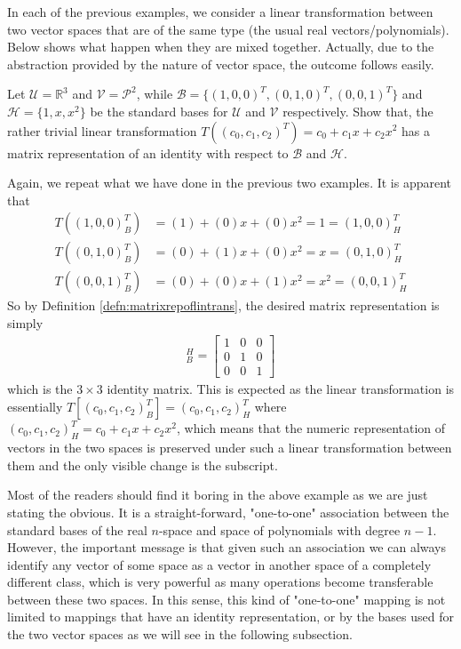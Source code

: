 In each of the previous examples, we consider a linear transformation between two vector spaces that are of the same type (the usual real vectors/polynomials). Below shows what happen when they are mixed together. Actually, due to the abstraction provided by the nature of vector space, the outcome follows easily.
\begin{exmp}
Let $\mathcal{U} = \mathbb{R}^3$ and $\mathcal{V} = \mathcal{P}^2$, while $\mathcal{B} = \{(1,0,0)^T, (0,1,0)^T, (0,0,1)^T\}$ and $\mathcal{H} = \{1, x, x^2\}$ be the standard bases for $\mathcal{U}$ and $\mathcal{V}$ respectively. Show that, the rather trivial linear transformation $T((c_0, c_1, c_2)^T) = c_0 + c_1x + c_2x^2$ has a matrix representation of an identity with respect to $\mathcal{B}$ and $\mathcal{H}$.
\end{exmp}
\begin{solution}
Again, we repeat what we have done in the previous two examples. It is apparent that
\begin{align*}
T((1,0,0)^T_B) &= (1) + (0)x + (0)x^2 = 1 = (1,0,0)^T_H\\
T((0,1,0)^T_B) &= (0) + (1)x + (0)x^2 = x = (0,1,0)^T_H\\
T((0,0,1)^T_B) &= (0) + (0)x + (1)x^2 = x^2 = (0,0,1)^T_H
\end{align*}
So by Definition \ref{defn:matrixrepoflintrans}, the desired matrix representation is simply
\begin{align*}
[T]_B^H = 
\begin{bmatrix}
1 & 0 & 0 \\
0 & 1 & 0 \\
0 & 0 & 1
\end{bmatrix}
\end{align*}
which is the $3 \times 3$ identity matrix. This is expected as the linear transformation is essentially $T[(c_0, c_1, c_2)_B^T] = (c_0, c_1, c_2)_H^T$ where $(c_0, c_1, c_2)_H^T = c_0 + c_1x + c_2x^2$, which means that the numeric representation of vectors in the two spaces is preserved under such a linear transformation between them and the only visible change is the subscript.
\end{solution}
Most of the readers should find it boring in the above example as we are just stating the obvious. It is a straight-forward, "one-to-one" association between the standard bases of the real $n$-space and space of polynomials with degree $n-1$. However, the important message is that given such an association we can always identify any vector of some space as a vector in another space of a completely different class, which is very powerful as many operations become transferable between these two spaces. In this sense, this kind of "one-to-one" mapping is not limited to mappings that have an identity representation, or by the bases used for the two vector spaces as we will see in the following subsection.

